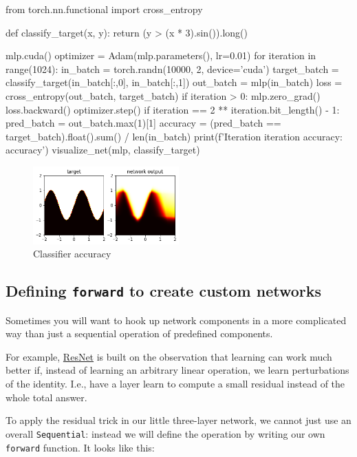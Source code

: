 \begin{codeblock}[language=python]
from torch.nn.functional import cross_entropy

def classify_target(x, y):
    return (y > (x * 3).sin()).long()

mlp.cuda()
optimizer = Adam(mlp.parameters(), lr=0.01)
for iteration in range(1024):
    in_batch = torch.randn(10000, 2, device='cuda')
    target_batch = classify_target(in_batch[:,0], in_batch[:,1])
    out_batch = mlp(in_batch)
    loss = cross_entropy(out_batch, target_batch)
    if iteration > 0:
        mlp.zero_grad()
        loss.backward()
        optimizer.step()
    if iteration == 2 ** iteration.bit_length() - 1:
        pred_batch = out_batch.max(1)[1]
        accuracy = (pred_batch == target_batch).float().sum() / len(in_batch)
        print(f'Iteration {iteration} accuracy: {accuracy}')
        visualize_net(mlp, classify_target)
\end{codeblock}

\begin{figure}[H]
    \centering
    \includegraphics[width=0.5\textwidth]{assets/fig10.png}
    \caption{Classifier accuracy}
\end{figure}

\subsection{Defining \texttt{forward} to create custom networks}

Sometimes you will want to hook up network components in a more complicated way than just a sequential operation of predefined components. 

For example, \href{https://arxiv.org/abs/1512.03385}{ResNet} is built on the observation that learning can work much better if, instead of learning an arbitrary linear operation, we learn perturbations of the identity. I.e., have a layer learn to compute a small residual instead of the whole total answer. 

To apply the residual trick in our little three-layer network, we cannot just use an overall \texttt{Sequential}: instead we will define the operation by writing our own \texttt{forward} function. It looks like this:

